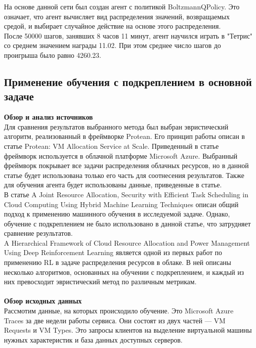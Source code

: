 \documentclass[draft]{article}
\begin{document}
На основе данной сети был создан агент с политикой BoltzmannQPolicy. Это означает, что агент вычисляет вид распределения значений, возвращаемых средой, и выбирает случайное действие на основе этого распределения.\\
После 50000 шагов, занявших 8 часов 11 минут, агент научился играть в "Тетрис" со среднем значением награды 11.02. При этом среднее число шагов до проигрыша было равно 4260.23.\\
\newpage
\begin{center}
\item\subsection{Применение обучения с подкреплением в основной задаче}
\end{center}
\textbf{Обзор и анализ источников}\\
Для сравнения результатов выбранного метода был выбран эвристический алгоритм, реализованный в фреймворке Protean. Его принцип работы описан в статье Protean: VM Allocation Service at Scale\cite{litlink21}. Приведенный в статье фреймворк используется в облачной платформе Microsoft Azure. Выбранный фреймворк покрывает все задачи распределения облачных ресурсов, но в данной статье будет использована только его часть для соотнесения результатов. Также для обучения агента будет использованы данные, приведенные в статье\cite{litlink22}.\\
В статье A Joint Resource Allocation, Security with Efficient Task Scheduling in Cloud Computing Using Hybrid Machine Learning Techniques\cite{litlink23} описан общий подход к применению машинного обучения в исследуемой задаче. Однако, обучение с подкреплением не было использовано в данной статье, что затрудняет сравнение результатов.\\
A Hierarchical Framework of Cloud Resource Allocation and Power Management Using Deep Reinforcement Learning\cite{litlink24} является одной из первых работ по применению RL в задаче распределения ресурсов в облаке. В ней описаны несколько алгоритмов, основанных на обучении с подкреплением, и каждый из них превосходит эвристический метод по различным метрикам.\\~\\
\textbf{Обзор исходных данных}\\
Рассмотим данные, на которых происходило обучение. Это Microsoft Azure Traces за две недели работы сервиса. Они состоят из двух частей — VM Requests и VM Types. Это запросы клиентов на выделение виртуальной машины нужных характеристик и база данных доступных серверов. 
\end{document}
